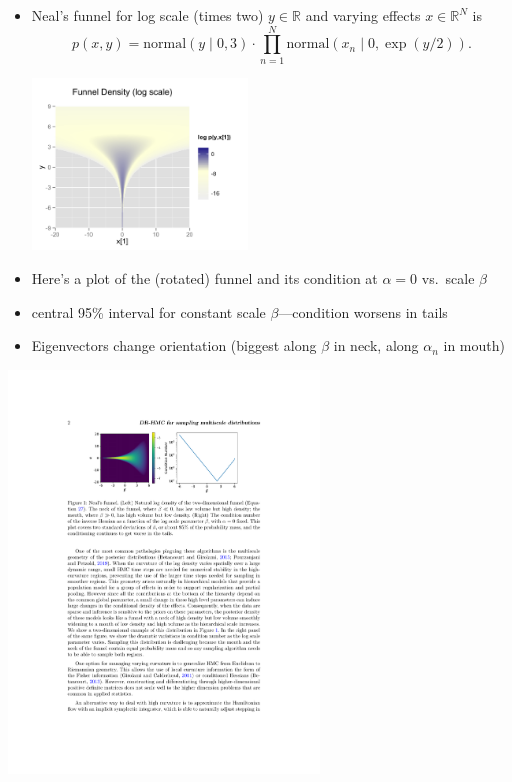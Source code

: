 \documentclass[10pt]{report}
\begin{document}
\begin{itemize}
  \item Neal's funnel for log scale (times two) $y \in \mathbb{R}$ and
    varying effects $x \in \mathbb{R}^N$ is
    $$ \textstyle 
    p(x, y) = \textrm{normal}(y \mid 0, 3) \cdot \prod_{n=1}^N 
    \textrm{normal}(x_n \mid 0, \exp(y / 2)). 
    $$
    \begin{center}
      \vspace*{-9pt}
    \includegraphics[width=2.25in]{img/funnel.png}
  \end{center}
\end{itemize}

\begin{itemize}
\item Here's a plot of the (rotated) funnel and its condition at
  $\alpha = 0$
  vs.\ scale $\beta$
\item central 95\% interval for constant scale $\beta$---condition
  worsens in tails
\item Eigenvectors change orientation (biggest along $\beta$ in neck,
  along $\alpha_n$ in mouth)
\end{itemize}
\begin{center}
  \includegraphics[width=3.25in]{img/funnel-condition.pdf}
\end{center}
\end{document}
